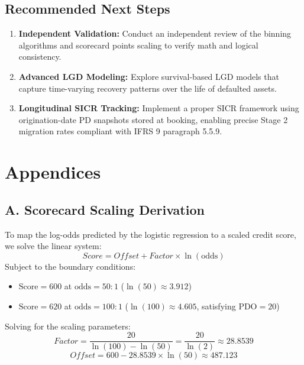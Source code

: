 \documentclass[11pt,a4paper]{article}
\begin{document}
\subsection{Recommended Next Steps}
\begin{enumerate}
    \item \textbf{Independent Validation:} Conduct an independent review of the binning algorithms and scorecard points scaling to verify math and logical consistency.
    \item \textbf{Advanced LGD Modeling:} Explore survival-based LGD models that capture time-varying recovery patterns over the life of defaulted assets.
    \item \textbf{Longitudinal SICR Tracking:} Implement a proper SICR framework using origination-date PD snapshots stored at booking, enabling precise Stage 2 migration rates compliant with IFRS 9 paragraph 5.5.9.
\end{enumerate}

\clearpage
\section{Appendices}

\subsection{A. Scorecard Scaling Derivation}
To map the log-odds predicted by the logistic regression to a scaled credit score, we solve the linear system:
\begin{equation}
Score = Offset + Factor \times \ln(\text{odds})
\end{equation}
Subject to the boundary conditions:
\begin{itemize}
    \item $\text{Score} = 600$ at $\text{odds} = 50:1$ ($\ln(50) \approx 3.912$)
    \item $\text{Score} = 620$ at $\text{odds} = 100:1$ ($\ln(100) \approx 4.605$, satisfying $\text{PDO} = 20$)
\end{itemize}
Solving for the scaling parameters:
\begin{equation}
Factor = \frac{20}{\ln(100) - \ln(50)} = \frac{20}{\ln(2)} \approx 28.8539
\end{equation}
\begin{equation}
Offset = 600 - 28.8539 \times \ln(50) \approx 487.123
\end{equation}
\end{document}
